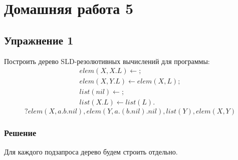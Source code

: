 \documentclass[11pt]{article}
\def\zall{\setcounter{lem}{0}\setcounter{cnsqnc}{0}\setcounter{th}{0}\setcounter{Cmt}{0}\setcounter{equation}{0}\setcounter{stnmt}{0}}
\newcounter{lem}\setcounter{lem}{0}
\newcounter{th}\setcounter{th}{0}
\newcounter{cnsqnc}\setcounter{cnsqnc}{0}
\newcounter{Cmt}\setcounter{Cmt}{0}
\newcounter{stnmt}\setcounter{stnmt}{0}
\begin{document}
\section{Домашняя работа 5}
\label{sec:org8f913af}
\zall
\subsection{Упражнение 1}
\label{sec:orgb657075}
Построить дерево SLD-резолютивных вычислений для программы:
\begin{gather}
elem(X, X.L) \leftarrow ; \\
elem(X, Y.L) \leftarrow elem(X, L) ; \\
list(nil) \leftarrow ; \\
list(X.L) \leftarrow list(L).
\end{gather}
\begin{equation*}
? elem(X, a.b.nil), elem(Y, a.(b.nil).nil), list(Y), elem(X, Y)
\end{equation*}
\subsubsection{Решение}
\label{sec:orgdf3920d}
Для каждого подзапроса дерево будем строить отдельно.
\end{document}
